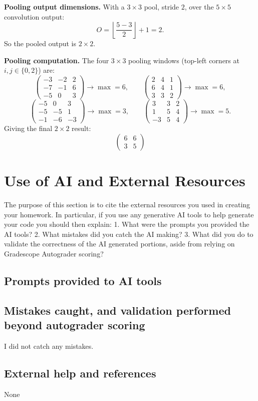 \documentclass[10pt]{article}
\begin{document}
\textbf{Pooling output dimensions.} With a $3\times3$ pool, stride $2$, over the $5\times5$
convolution output:
\[
O = \left\lfloor\frac{5-3}{2}\right\rfloor+1 = 2.
\]
So the pooled output is $2\times2$.

\textbf{Pooling computation.} The four $3\times3$ pooling windows (top-left corners at
$i,j\in\{0,2\}$) are:
\[
\begin{pmatrix}-3&-2&2\\-7&-1&6\\-5&0&3\end{pmatrix}\!\to\!\max=6,\qquad
\begin{pmatrix}2&4&1\\6&4&1\\3&3&2\end{pmatrix}\!\to\!\max=6,
\]
\[
\begin{pmatrix}-5&0&3\\-5&-5&1\\-1&-6&-3\end{pmatrix}\!\to\!\max=3,\qquad
\begin{pmatrix}3&3&2\\1&5&4\\-3&5&4\end{pmatrix}\!\to\!\max=5.
\]
Giving the final $2\times2$ result:
\[
\begin{pmatrix}
6 & 6 \\
3 & 5
\end{pmatrix}
\]

\section{Use of AI and External Resources}
\label{sec:ai}

\begin{question}
The purpose of this section is to cite the external resources you used in creating your homework.
In particular, if you use any generative AI tools to help generate your code you should then
explain:
1. What were the prompts you provided the AI tools?
2. What mistakes did you catch the AI making?
3. What did you do to validate the correctness of the AI generated portions, aside from relying on
Gradescope Autograder scoring?
\end{question}

\subsection{Prompts provided to AI tools}
\label{sec:ai-prompts}



\subsection{Mistakes caught, and validation performed beyond autograder scoring}
\label{sec:ai-log}

I did not catch any mistakes.


\subsection{External help and references}
\label{sec:ai-external}
None
\end{document}
